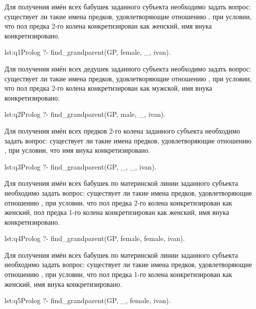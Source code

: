 Для получения имён всех бабушек заданного субъекта необходимо 
задать вопрос: существует ли такие имена предков, удовлетворяющие 
отношению , при условии, что пол предка 2-го колена
конкретизирован как женский, имя внука конкретизировано.

\begin{listing}{lst:q1}{Prolog}
?- find\_grandparent(GP, female, \_, ivan).
\end{listing}

Для получения имён всех дедушек заданного субъекта необходимо 
задать вопрос: существует ли такие имена предков, удовлетворяющие 
отношению , при условии, что пол предка 2-го колена
конкретизирован как мужской, имя внука конкретизировано.

\begin{listing}{lst:q2}{Prolog}
?- find\_grandparent(GP, male, \_, ivan).
\end{listing}

Для получения имён всех предков 2-го колена заданного субъекта необходимо 
задать вопрос: существует ли такие имена предков, удовлетворяющие 
отношению , при условии, что имя внука конкретизировано.

\begin{listing}{lst:q3}{Prolog}
?- find\_grandparent(GP, \_, \_, ivan).
\end{listing}

Для получения имён всех бабушек по материнской линии заданного субъекта необходимо 
задать вопрос: существует ли такие имена предков, удовлетворяющие 
отношению , при условии, что пол предка 2-го колена
конкретизирован как женский, пол предка 1-го колена
конкретизирован как женский, имя внука конкретизировано.

\begin{listing}{lst:q4}{Prolog}
?- find\_grandparent(GP, female, female, ivan).
\end{listing}

Для получения имён всех бабушек по материнской линии заданного субъекта необходимо 
задать вопрос: существует ли такие имена предков, удовлетворяющие 
отношению , при условии, что пол предка 1-го колена
конкретизирован как женский, имя внука конкретизировано.

\begin{listing}{lst:q5}{Prolog}
?- find\_grandparent(GP, \_, female, ivan).
\end{listing}

